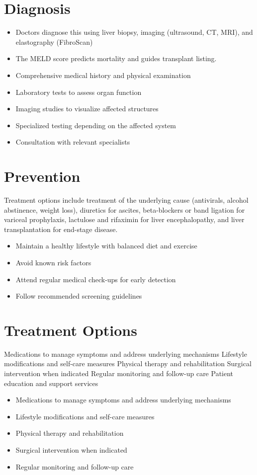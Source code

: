 \section{Diagnosis}
\begin{itemize}[noitemsep]
  \item Doctors diagnose this using liver biopsy, imaging (ultrasound, CT, MRI), and elastography (FibroScan)
  \item The MELD score predicts mortality and guides transplant listing.
  \item Comprehensive medical history and physical examination
  \item Laboratory tests to assess organ function
  \item Imaging studies to visualize affected structures
  \item Specialized testing depending on the affected system
  \item Consultation with relevant specialists
\end{itemize}
\section{Prevention}
Treatment options include treatment of the underlying cause (antivirals, alcohol abstinence, weight loss), diuretics for ascites, beta-blockers or band ligation for variceal prophylaxis, lactulose and rifaximin for liver encephalopathy, and liver transplantation for end-stage disease.

\begin{itemize}[noitemsep]
  \item Maintain a healthy lifestyle with balanced diet and exercise
  \item Avoid known risk factors
  \item Attend regular medical check-ups for early detection
  \item Follow recommended screening guidelines
\end{itemize}
\section{Treatment Options}
Medications to manage symptoms and address underlying mechanisms Lifestyle modifications and self-care measures Physical therapy and rehabilitation Surgical intervention when indicated Regular monitoring and follow-up care Patient education and support services

\begin{itemize}[noitemsep]
  \item Medications to manage symptoms and address underlying mechanisms
  \item Lifestyle modifications and self-care measures
  \item Physical therapy and rehabilitation
  \item Surgical intervention when indicated
  \item Regular monitoring and follow-up care
\end{itemize}
